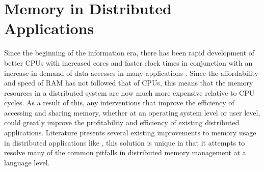 \section{Memory in Distributed Applications}
Since the beginning of the information era, there has been rapid development of better CPUs with increased cores and faster clock times in conjunction with an increase in demand of data accesses in many applications \cite{sharing_cpu_memory}. Since the affordability and speed of RAM has not followed that of CPUs, this means that the memory resources in a distributed system are now much more expensive relative to CPU cycles. As a result of this, any interventions that improve the efficiency of accessing and sharing memory, whether at an operating system level or user level, could greatly improve the profitability and efficiency of existing distributed applications. Literature presents several existing improvements to memory usage in distributed applications like \cite{virtual_memory_tlb} \cite{sharing_cpu_memory}, this solution is unique in that it attempts to resolve many of the common pitfalls in distributed memory management at a language level. 
